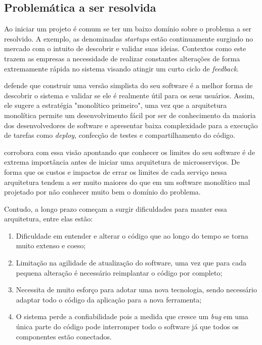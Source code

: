 \subsection{Problemática a ser resolvida}

Ao iniciar um projeto é comum se ter um baixo domínio sobre o problema a ser resolvido. A exemplo,
as denominadas \textit{startups} estão continuamente surgindo no mercado com o intuito de descobrir
e validar suas ideias. Contextos como este trazem as empresas a necessidade de realizar constantes
alterações de forma extremamente rápida no sistema visando atingir um curto ciclo de
\textit{feedback}.

 defende que construir uma versão simplista do seu software é
a melhor forma de descobrir o sistema e validar se ele é realmente útil para os seus usuários.
Assim, ele sugere a estratégia "monolítico primeiro", uma vez que a arquitetura monolítica permite
um desenvolvimento fácil por ser de conhecimento da maioria dos desenvolvedores de software e
apresentar baixa complexidade para a execução de tarefas como \textit{deploy}, confecção de testes
e compartilhamento do código.

 corrobora com essa visão apontando que conhecer os limites do seu
software é de extrema importância antes de iniciar uma arquitetura de microsserviços. De forma que
os custos e impactos de errar os limites de cada serviço nessa arquitetura tendem a ser muito
maiores do que em um software monolítico mal projetado por não conhecer muito bem o domínio do
problema.

Contudo, a longo prazo começam a surgir dificuldades para manter essa
arquitetura, entre elas estão:

  \begin{enumerate}
    \item Dificuldade em entender e alterar o código que ao longo do tempo se torna
    muito extenso e coeso;
    \item Limitação na agilidade de atualização do software, uma vez que para cada
    pequena alteração é necessário reimplantar o código por completo;
    \item Necessita de muito esforço para adotar uma nova tecnologia, sendo
    necessário adaptar todo o código da aplicação para a nova ferramenta;
    \item O sistema perde a confiabilidade pois a medida que cresce um \textit{bug}
    em uma única parte do código pode interromper todo o software já que todos os
    componentes estão conectados.
  \end{enumerate}

